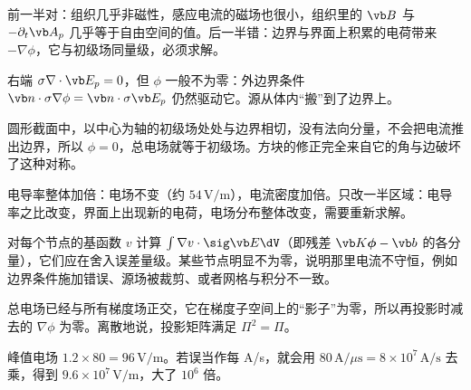 \begin{answers}
\item 前一半对：组织几乎非磁性，感应电流的磁场也很小，组织里的 $\vb B$ 与 $-\partial_t\vb A_p$ 几乎等于自由空间的值。后一半错：边界与界面上积累的电荷带来 $-\nabla\phi$，它与初级场同量级，必须求解。
\item 右端 $\sigma\nabla\cdot\vb E_p=0$，但 $\phi$ 一般不为零：外边界条件 $\vb n\cdot\sigma\nabla\phi=\vb n\cdot\sigma\vb E_p$ 仍然驱动它。源从体内“搬”到了边界上。
\item 圆形截面中，以中心为轴的初级场处处与边界相切，没有法向分量，不会把电流推出边界，所以 $\phi=0$，总电场就等于初级场。方块的修正完全来自它的角与边破坏了这种对称。
\item 电导率整体加倍：电场不变（约 $54\,\mathrm{V/m}$），电流密度加倍。只改一半区域：电导率之比改变，界面上出现新的电荷，电场分布整体改变，需要重新求解。
\item 对每个节点的基函数 $v$ 计算 $\int\nabla v\cdot\sig\vb E\dV$（即残差 $\vb K\boldsymbol\phi-\vb b$ 的各分量），它们应在舍入误差量级。某些节点明显不为零，说明那里电流不守恒，例如边界条件施加错误、源场被裁剪、或者网格与积分不一致。
\item 总电场已经与所有梯度场正交，它在梯度子空间上的“影子”为零，所以再投影时减去的 $\nabla\phi$ 为零。离散地说，投影矩阵满足 $\Pi^2=\Pi$。
\item 峰值电场 $1.2\times80=96\,\mathrm{V/m}$。若误当作每 A/s，就会用 $80\,\mathrm{A}/\mu\mathrm{s}=8\times10^{7}\,\mathrm{A/s}$ 去乘，得到 $9.6\times10^{7}\,\mathrm{V/m}$，大了 $10^6$ 倍。
\end{answers}
